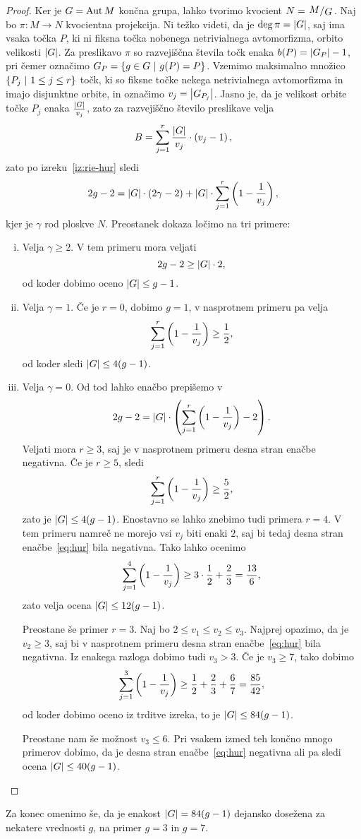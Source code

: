 \begin{proof}
Ker je $G = \operatorname{Aut} M$ končna grupa, lahko tvorimo kvocient
$N = \kvoc{M}{G}$. Naj bo $\pi \colon M \to N$ kvocientna
projekcija. Ni težko videti, da je $\deg \pi = \left\lvert G\right\rvert$, saj ima
vsaka točka $P$, ki ni fiksna točka nobenega netrivialnega
avtomorfizma, orbito velikosti $\left\lvert G\right\rvert$. Za preslikavo $\pi$ so
razvejiščna števila točk enaka $b(P) = \left\lvert G_P\right\rvert - 1$, pri čemer
označimo $G_P = \left\{g \in G~\middle\vert~g(P) = P\right\}$. Vzemimo maksimalno
množico $\left\{P_j~\middle\vert~1 \leq j \leq r\right\}$ točk, ki so fiksne točke
nekega netrivialnega avtomorfizma in imajo disjunktne orbite, in
označimo $v_j = \left\lvert G_{P_j}\right\rvert$. Jasno je, da je velikost orbite
točke $P_j$ enaka $\frac{\left\lvert G\right\rvert}{v_j}$, zato za razvejiščno
število preslikave velja
\[
B = \sum_{j=1}^r \frac{\left\lvert G\right\rvert}{v_j} \cdot \left(v_j - 1\right),
\]
zato po izreku~\ref{iz:rie-hur} sledi
\[
2g - 2 = \left\lvert G\right\rvert \cdot (2 \gamma - 2) +
\left\lvert G\right\rvert \cdot \sum_{j=1}^r \left(1 - \frac{1}{v_j}\right),
\]
kjer je $\gamma$ rod ploskve $N$. Preostanek dokaza ločimo na tri
primere:

\begin{enumerate}[i)]
\item Velja $\gamma \geq 2$. V tem primeru mora veljati
\[
2g - 2 \geq \left\lvert G\right\rvert \cdot 2,
\]
od koder dobimo oceno $\left\lvert G\right\rvert \leq g-1$.

\item Velja $\gamma = 1$. Če je $r=0$, dobimo $g=1$, v nasprotnem
primeru pa velja
\[
\sum_{j=1}^r \left(1 - \frac{1}{v_j}\right) \geq \frac{1}{2},
\]
od koder sledi $\left\lvert G\right\rvert \leq 4(g-1)$.

\item Velja $\gamma = 0$. Od tod lahko enačbo prepišemo v
\begin{equation}\label{eq:hur}
2g - 2 =
\left\lvert G\right\rvert \cdot \left(\sum_{j=1}^r \left(1 - \frac{1}{v_j}\right) - 2\right).
\end{equation}
Veljati mora $r \geq 3$, saj je v nasprotnem primeru desna stran
enačbe negativna. Če je $r \geq 5$, sledi
\[
\sum_{j=1}^r \left(1 - \frac{1}{v_j}\right) \geq \frac{5}{2},
\]
zato je $\left\lvert G\right\rvert \leq 4(g-1)$. Enostavno se lahko znebimo tudi
primera $r=4$. V tem primeru namreč ne morejo vsi $v_j$ biti enaki
$2$, saj bi tedaj desna stran enačbe~\eqref{eq:hur} bila negativna.
Tako lahko ocenimo
\[
\sum_{j=1}^4 \left(1 - \frac{1}{v_j}\right) \geq
3 \cdot \frac{1}{2} + \frac{2}{3} =
\frac{13}{6},
\]
zato velja ocena $\left\lvert G\right\rvert \leq 12(g-1)$.

Preostane še primer $r=3$. Naj bo $2 \leq v_1 \leq v_2 \leq v_3$.
Najprej opazimo, da je $v_2 \geq 3$, saj bi v nasprotnem primeru
desna stran enačbe~\eqref{eq:hur} bila negativna. Iz enakega
razloga dobimo tudi $v_3 > 3$. Če je $v_3 \geq 7$, tako dobimo
\[
\sum_{j=1}^3 \left(1 - \frac{1}{v_j}\right) \geq
\frac{1}{2} + \frac{2}{3} + \frac{6}{7} = \frac{85}{42},
\]
od koder dobimo oceno iz trditve izreka, to je
$\left\lvert G\right\rvert \leq 84(g-1)$.

Preostane nam še možnost $v_3 \leq 6$. Pri vsakem izmed teh končno
mnogo primerov dobimo, da je desna stran enačbe~\eqref{eq:hur}
negativna ali pa sledi ocena $\left\lvert G\right\rvert \leq 40(g-1)$. \qedhere
\end{enumerate}
\end{proof}

Za konec omenimo še, da je enakost $\left\lvert G\right\rvert = 84 (g-1)$ dejansko
dosežena za nekatere vrednosti $g$, na primer $g = 3$ in $g = 7$.
